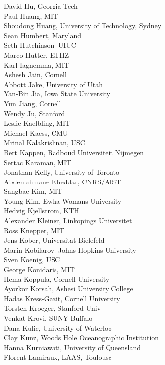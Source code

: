 \begin{multicols}{3}
{David Hu, Georgia Tech\\
Paul Huang, MIT\\
Shoudong Huang, University of Technology, Sydney\\
Sean Humbert, Maryland\\
Seth Hutchinson, UIUC\\
Marco Hutter, ETHZ\\
Karl Iagnemma, MIT\\
Ashesh Jain, Cornell\\
Abbott Jake, University of Utah\\
Yan-Bin Jia, Iowa State University\\
Yun Jiang, Cornell\\
Wendy Ju, Stanford\\
Leslie Kaelbling, MIT\\
Michael Kaess, CMU\\
Mrinal Kalakrishnan, USC\\
Bert Kappen, Radboud Universiteit Nijmegen\\
Sertac Karaman, MIT\\
Jonathan Kelly, University of Toronto\\
Abderrahmane Kheddar, CNRS/AIST\\
Sangbae Kim, MIT\\
Young Kim, Ewha Womans University\\
Hedvig Kjellstrom, KTH\\
Alexander Kleiner, Linkopings Universitet\\
Ross Knepper, MIT\\
Jens Kober, Universitat Bielefeld\\
Marin Kobilarov, Johns Hopkins University\\
Sven Koenig, USC\\
George Konidaris, MIT\\
Hema Koppula, Cornell University\\
Ayorkor Korsah, Ashesi University College\\
Hadas Kress-Gazit, Cornell University\\
Torsten Kroeger, Stanford Univ\\
Venkat Krovi, SUNY Buffalo\\
Dana Kulic, University of Waterloo\\
Clay Kunz, Woods Hole Oceanographic Institution\\
Hanna Kurniawati, University of Queensland\\
Florent Lamiraux, LAAS, Toulouse\\
}
\end{multicols}
